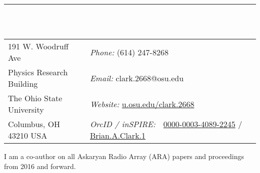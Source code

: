 \documentclass{resume} %
\begin{document}

\vspace{-1cm}
\rule{\textwidth}{0.1cm} \\ \\
\begin{tabular}{@{}p{2in}p{4in}}
191 W. Woodruff Ave             & {\it Phone:}  (614) 247-8268 \\            
Physics Research Building   & {\it Email:}  clark.2668@osu.edu 
 \\         
The Ohio State University & {\it Website:} \url{u.osu.edu/clark.2668} \\       
Columbus, OH  43210 USA  & {\it OrcID / inSPIRE:} \,\,      \href{https://orcid.org/0000-0003-4089-2245}{0000-0003-4089-2245}  / \href{https://inspirehep.net/author/profile/Brian.A.Clark.1}{Brian.A.Clark.1}\\     
\end{tabular}

I am a co-author on all Askaryan Radio Array (ARA) papers and proceedings from 2016 and forward.
\end{document}
